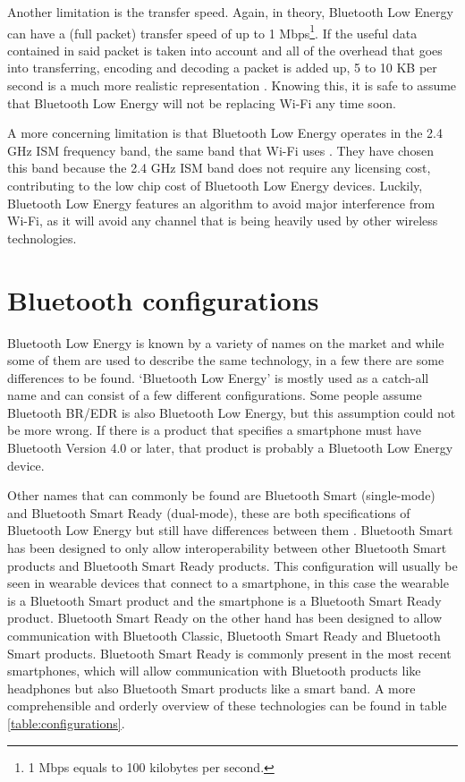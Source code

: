 \documentclass[pdftex,a4paper,12pt,twoside]{report}
\begin{document}
Another limitation is the transfer speed. Again, in theory, Bluetooth Low Energy can have a (full packet) transfer speed of up to 1 Mbps\footnote{1 Mbps equals to 100 kilobytes per second.}. If the useful data contained in said packet is taken into account and all of the overhead that goes into transferring, encoding and decoding a packet is added up, 5 to 10 KB per second is a much more realistic representation \citep{heydon2012bluetooth}. Knowing this, it is safe to assume that Bluetooth Low Energy will not be replacing Wi-Fi any time soon.

A more concerning limitation is that Bluetooth Low Energy operates in the 2.4 GHz ISM frequency band, the same band that Wi-Fi uses \citep{bluetooth2014bluetooth}. They have chosen this band because the 2.4 GHz ISM band does not require any licensing cost, contributing to the low chip cost of Bluetooth Low Energy devices. Luckily, Bluetooth Low Energy features an algorithm to avoid major interference from Wi-Fi, as it will avoid any channel that is being heavily used by other wireless technologies.

\section{Bluetooth configurations}
\label{sec:bleconfigurations}
Bluetooth Low Energy is known by a variety of names on the market and while some of them are used to describe the same technology, in a few there are some differences to be found. `Bluetooth Low Energy' is mostly used as a catch-all name and can consist of a few different configurations. Some people assume Bluetooth BR/EDR is also Bluetooth Low Energy, but this assumption could not be more wrong. If there is a product that specifies a smartphone must have Bluetooth Version 4.0 or later, that product is probably a Bluetooth Low Energy device.

Other names that can commonly be found are Bluetooth Smart (single-mode) and Bluetooth Smart Ready (dual-mode), these are both specifications of Bluetooth Low Energy but still have differences between them \citep{Townsend2014}. Bluetooth Smart has been designed to only allow interoperability between other Bluetooth Smart products and Bluetooth Smart Ready products. This configuration will usually be seen in wearable devices that connect to a smartphone, in this case the wearable is a Bluetooth Smart product and the smartphone is a Bluetooth Smart Ready product. Bluetooth Smart Ready on the other hand has been designed to allow communication with Bluetooth Classic, Bluetooth Smart Ready and Bluetooth Smart products. Bluetooth Smart Ready is commonly present in the most recent smartphones, which will allow communication with Bluetooth products like headphones but also Bluetooth Smart products like a smart band. A more comprehensible and orderly overview of these technologies can be found in table \ref{table:configurations}.
\end{document}
